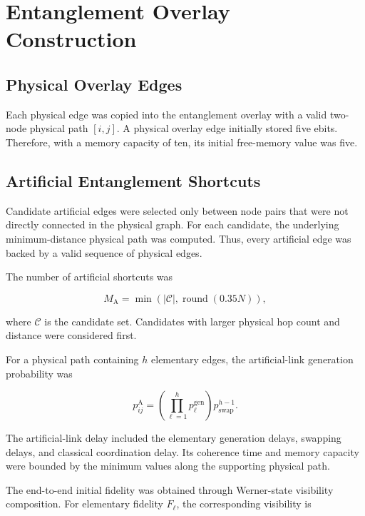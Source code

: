 \section{Entanglement Overlay Construction}

\subsection{Physical Overlay Edges}

Each physical edge was copied into the entanglement overlay with a valid
two-node physical path \([i,j]\). A physical overlay edge initially stored five
ebits. Therefore, with a memory capacity of ten, its initial free-memory value
was five.

\subsection{Artificial Entanglement Shortcuts}

Candidate artificial edges were selected only between node pairs that were not
directly connected in the physical graph. For each candidate, the underlying
minimum-distance physical path was computed. Thus, every artificial edge was
backed by a valid sequence of physical edges.

The number of artificial shortcuts was

\begin{equation}
M_{\mathrm{A}}
=
\min
\left(
|\mathcal{C}|,
\operatorname{round}(0.35N)
\right),
\end{equation}

where \(\mathcal{C}\) is the candidate set. Candidates with larger physical hop
count and distance were considered first.

For a physical path containing \(h\) elementary edges, the artificial-link
generation probability was

\begin{equation}
p_{ij}^{\mathrm{A}}
=
\left(
\prod_{\ell=1}^{h}
p_{\ell}^{\mathrm{gen}}
\right)
p_{\mathrm{swap}}^{h-1}.
\end{equation}

The artificial-link delay included the elementary generation delays, swapping
delays, and classical coordination delay. Its coherence time and memory capacity
were bounded by the minimum values along the supporting physical path.

The end-to-end initial fidelity was obtained through Werner-state visibility
composition. For elementary fidelity \(F_\ell\), the corresponding visibility is

